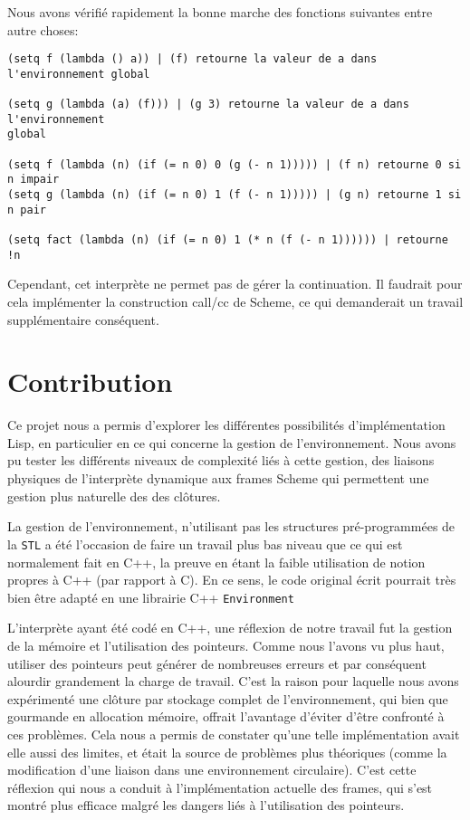 \documentclass[a4paper,11pt]{article}
\begin{document}
 Nous avons vérifié rapidement la bonne marche des fonctions suivantes entre
 autre choses:

\begin{lstlisting}
(setq f (lambda () a)) | (f) retourne la valeur de a dans l'environnement global

(setq g (lambda (a) (f))) | (g 3) retourne la valeur de a dans l'environnement
global

(setq f (lambda (n) (if (= n 0) 0 (g (- n 1))))) | (f n) retourne 0 si n impair
(setq g (lambda (n) (if (= n 0) 1 (f (- n 1))))) | (g n) retourne 1 si n pair

(setq fact (lambda (n) (if (= n 0) 1 (* n (f (- n 1)))))) | retourne !n
\end{lstlisting}
 
 Cependant, cet interprète ne permet pas de gérer la continuation. Il faudrait pour 
 cela implémenter la construction call/cc de Scheme, ce qui demanderait un travail supplémentaire 
 conséquent.


\section{Contribution}

Ce projet nous a permis d'explorer les différentes possibilités d'implémentation 
Lisp, en particulier en ce qui concerne la gestion de l'environnement. Nous avons pu 
tester les différents niveaux de complexité liés à cette gestion, des liaisons physiques
de l'interprète dynamique aux frames Scheme qui permettent une gestion plus naturelle des
des clôtures.

La gestion de l'environnement, n'utilisant pas les structures pré-programmées de
la \texttt{STL} a été l'occasion de faire un travail plus bas niveau que ce qui
est normalement fait en C++, la preuve en étant la faible utilisation de
notion propres à C++ (par rapport à C). En ce sens, le code original écrit
pourrait très bien être adapté en une librairie C++ \texttt{Environment}

L'interprète ayant été codé en C++, une réflexion de notre travail fut la gestion de la 
mémoire et l’utilisation des pointeurs. Comme nous l'avons vu plus haut, utiliser 
des pointeurs peut générer de nombreuses erreurs et par conséquent alourdir grandement la charge 
de travail. C'est la raison pour laquelle nous avons expérimenté une clôture par stockage 
complet de l'environnement, qui bien que gourmande en allocation mémoire, offrait l'avantage 
d'éviter d'être confronté à ces problèmes. Cela nous a permis de constater qu'une telle 
implémentation avait elle aussi des limites, et était la source de problèmes plus théoriques 
(comme la modification d'une liaison dans une environnement circulaire). C'est cette réflexion 
qui nous a conduit à l'implémentation actuelle des frames, qui s'est montré plus efficace 
malgré les dangers liés à l'utilisation des pointeurs.
\end{document}
